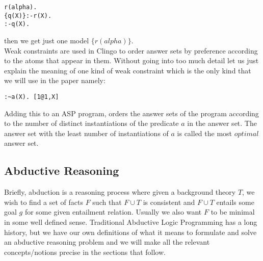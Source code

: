 \begin{lstlisting}[frame=none]
r(alpha).
{q(X)}:-r(X).
:-q(X).
\end{lstlisting}
then we get just one model $\{r(alpha)\}$.\\
Weak constraints are used in Clingo to order answer sets by preference according to the atoms that appear in them. Without going into too much detail let us just explain the meaning of one kind of weak constraint which is the only kind that we will use in the paper namely:
\begin{lstlisting}[frame=none]
:~a(X). [1@1,X]
\end{lstlisting}
Adding this to an ASP program, orders the answer sets of the program according to the number of distinct instantiations of the predicate $a$ in the answer set. The answer set with the least number of instantiations of $a$ is called the most $optimal$ answer set. 
\subsection{Abductive Reasoning}
Briefly, abduction is a reasoning process where given a background theory $T$, we wish to find a set of facts $F$ such that $F\cup T$ is consistent and $F\cup T$ entails some goal $g$ for some given entailment relation. Usually we also want $F$ to be minimal in some well defined sense. Traditional Abductive Logic Programming has a long history, but we have our own definitions of what it means to formulate and solve an abductive reasoning problem and we will make all the relevant concepts/notions precise in the sections that follow.  


